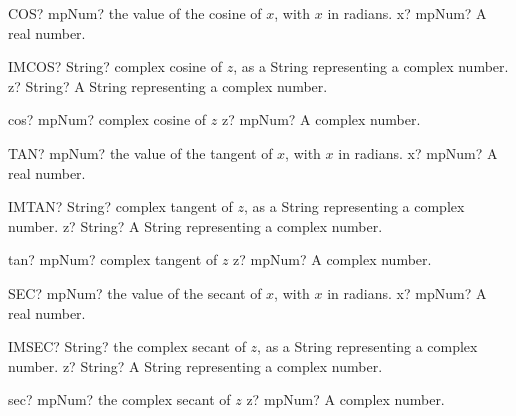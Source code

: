 \documentclass[12pt,a4paper,openany]{book}
\begin{document}
\begin{mpFunctionsExtract}
\mpWorksheetFunctionOneNotImplemented
{COS? mpNum? the value of the cosine of $x$, with $x$ in radians.}
{x? mpNum? A real number.}
\end{mpFunctionsExtract}

\begin{mpFunctionsExtract}
\mpWorksheetFunctionOneNotImplemented
{IMCOS? String? complex cosine of $z$, as a String representing a complex number.}
{z? String? A String representing a complex number.}
\end{mpFunctionsExtract}

\begin{mpFunctionsExtract}
\mpFunctionOne
{cos? mpNum? complex cosine of $z$}
{z? mpNum? A complex number.}
\end{mpFunctionsExtract}

\begin{mpFunctionsExtract}
\mpWorksheetFunctionOneNotImplemented
{TAN? mpNum? the value of the tangent of $x$, with $x$ in radians.}
{x? mpNum? A real number.}
\end{mpFunctionsExtract}

\begin{mpFunctionsExtract}
\mpWorksheetFunctionOneNotImplemented
{IMTAN? String? complex tangent of $z$, as a String representing a complex number.}
{z? String? A String representing a complex number.}
\end{mpFunctionsExtract}

\begin{mpFunctionsExtract}
\mpFunctionOne
{tan? mpNum? complex tangent of $z$}
{z? mpNum? A complex number.}
\end{mpFunctionsExtract}

\begin{mpFunctionsExtract}
\mpWorksheetFunctionOneNotImplemented
{SEC? mpNum? the value of the secant of $x$, with $x$ in radians.}
{x? mpNum? A real number.}
\end{mpFunctionsExtract}

\begin{mpFunctionsExtract}
\mpWorksheetFunctionOneNotImplemented
{IMSEC? String? the complex secant of $z$, as a String representing a complex number.}
{z? String? A String representing a complex number.}
\end{mpFunctionsExtract}

\begin{mpFunctionsExtract}
\mpFunctionOne
{sec? mpNum? the complex secant of $z$}
{z? mpNum? A complex number.}
\end{mpFunctionsExtract}
\end{document}
